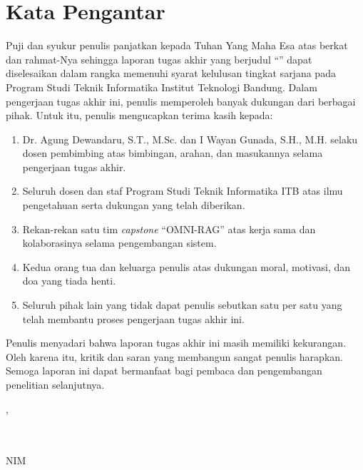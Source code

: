\chapter*{Kata Pengantar}

Puji dan syukur penulis panjatkan kepada Tuhan Yang Maha Esa atas berkat dan rahmat-Nya sehingga laporan tugas akhir yang berjudul ``\ThesisTitleTitleCase'' dapat diselesaikan dalam rangka memenuhi syarat kelulusan tingkat sarjana pada Program Studi Teknik Informatika Institut Teknologi Bandung. Dalam pengerjaan tugas akhir ini, penulis memperoleh banyak dukungan dari berbagai pihak. Untuk itu, penulis mengucapkan terima kasih kepada:

\begin{enumerate}
    \item Dr. Agung Dewandaru, S.T., M.Sc. dan I Wayan Gunada, S.H., M.H. selaku dosen pembimbing atas bimbingan, arahan, dan masukannya selama pengerjaan tugas akhir.
    \item Seluruh dosen dan staf Program Studi Teknik Informatika ITB atas ilmu pengetahuan serta dukungan yang telah diberikan.
    \item Rekan-rekan satu tim \emph{capstone} ``OMNI-RAG'' atas kerja sama dan kolaborasinya selama pengembangan sistem.
    \item Kedua orang tua dan keluarga penulis atas dukungan moral, motivasi, dan doa yang tiada henti.
    \item Seluruh pihak lain yang tidak dapat penulis sebutkan satu per satu yang telah membantu proses pengerjaan tugas akhir ini.
\end{enumerate}
\thispagestyle{plain}

\noindent\begin{minipage}{\textwidth}
Penulis menyadari bahwa laporan tugas akhir ini masih memiliki kekurangan. Oleh karena itu, kritik dan saran yang membangun sangat penulis harapkan. Semoga laporan ini dapat bermanfaat bagi pembaca dan pengembangan penelitian selanjutnya.

\begin{flushright}
    \begingroup
    \vspace{0.15cm}
    \SubmissionCity, \ApprovalDate

    \vspace{0.2cm}
    \AuthorSignature\\[-0.2cm]
    \AuthorName \\
    NIM \StudentID
    \endgroup
\end{flushright}
\end{minipage}
